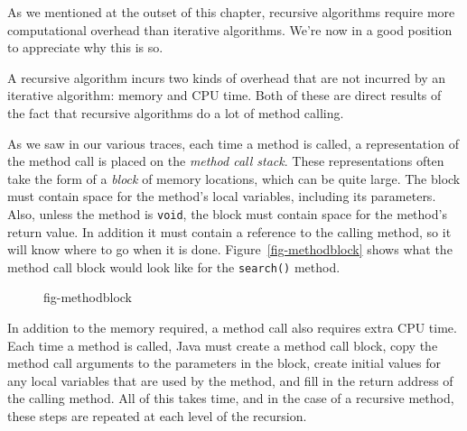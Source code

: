 
\noindent As we mentioned at the outset of this chapter, recursive
algorithms require more computational overhead than iterative
algorithms.  We're now in a good position to appreciate why this is
so.

A recursive algorithm incurs two kinds of overhead that are not
incurred by an iterative algorithm: memory and CPU time.  Both of these
are direct results of the fact that recursive algorithms do a lot of
method calling.

As we saw in our various traces, each time a method is called,
a representation of the method call is placed on the {\it method call
stack}. These \mbox{representations} often take the form of a {\it block} of
memory locations, which can be quite large.  The block must contain
space for the method's local variables, including its
parameters.  Also, unless the method is {\tt void}, the block must
contain space for the method's return value.  In addition it must
contain a reference to the calling method, so it will know where to go
when it is done.  Figure~\ref{fig-methodblock} shows what the method
call block would look like for the {\tt search()} method.

\begin{figure}[hb]
{fig-methodblock}
\end{figure}

In addition to the memory required, a method call also requires extra
CPU time.   Each time a method is called, Java must create a method
call block, copy the method call arguments to the parameters in the
block, create initial values for any local variables that are used by
the method, and fill in the return address of the calling method.  All
of this takes time, and in the case of a recursive method, these steps
are repeated at each level of the recursion.

